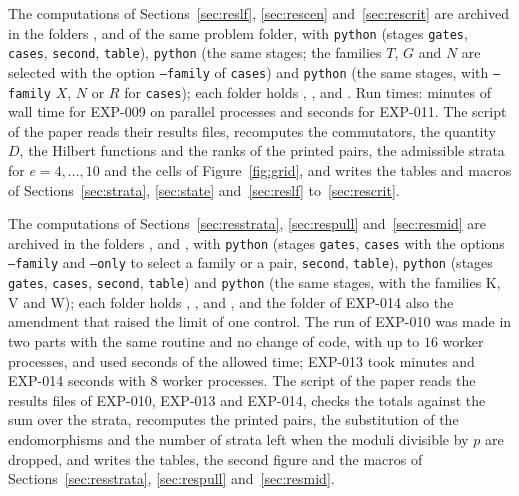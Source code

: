 \documentclass[11pt]{article}
\theoremstyle{definition}
\theoremstyle{remark}
\newcommand{\EXP}[1]{\mbox{EXP-#1}}
\begin{document}
The computations of Sections~\ref{sec:reslf}, \ref{sec:rescen} and~\ref{sec:rescrit} are archived in the folders ,  and  of the same problem folder, with \texttt{python}  (stages \texttt{gates}, \texttt{cases}, \texttt{second}, \texttt{table}), \texttt{python}  (the same stages; the families $T$, $G$ and $N$ are selected with the option \texttt{--family} of \texttt{cases}) and \texttt{python}  (the same stages, with \texttt{--family} $X$, $N$ or $R$ for \texttt{cases}); each folder holds , ,  and . Run times: \nlfWallMin{} minutes of wall time for \EXP{009} on parallel processes and \ncenSeconds{} seconds for \EXP{011}. The script of the paper reads their results files, recomputes the commutators, the quantity $D$, the Hilbert functions and the ranks of the printed pairs, the admissible strata for $e=4,\dots,10$ and the cells of Figure~\ref{fig:grid}, and writes the tables and macros of Sections~\ref{sec:strata}, \ref{sec:state} and~\ref{sec:reslf} to~\ref{sec:rescrit}.

The computations of Sections~\ref{sec:resstrata}, \ref{sec:respull} and~\ref{sec:resmid} are archived in the folders ,  and , with \texttt{python}  (stages \texttt{gates}, \texttt{cases} with the options \texttt{--family} and \texttt{--only} to select a family or a pair, \texttt{second}, \texttt{table}), \texttt{python}  (stages \texttt{gates}, \texttt{cases}, \texttt{second}, \texttt{table}) and \texttt{python}  (the same stages, with the families K, V and W); each folder holds , ,  and , and the folder of \EXP{014} also the amendment that raised the limit of one control. The run of \EXP{010} was made in two parts with the same routine and no change of code, with up to $16$ worker processes, and used \nwcSeconds{} seconds of the allowed time; \EXP{013} took \npbSeconds{} minutes and \EXP{014} \nmidSeconds{} seconds with $8$ worker processes. The script of the paper reads the results files of \EXP{010}, \EXP{013} and \EXP{014}, checks the totals against the sum over the strata, recomputes the printed pairs, the substitution of the endomorphisms and the number of strata left when the moduli divisible by $p$ are dropped, and writes the tables, the second figure and the macros of Sections~\ref{sec:resstrata}, \ref{sec:respull} and~\ref{sec:resmid}.
\end{document}
